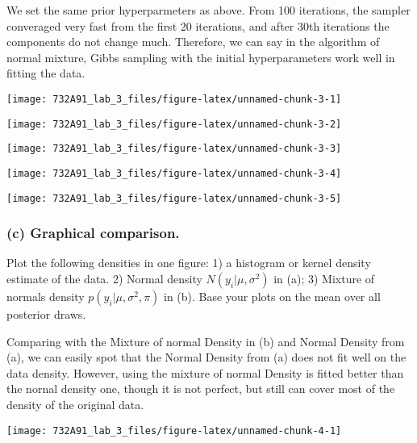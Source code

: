 \documentclass[]{article}
\begin{document}
We set the same prior hyperparmeters as above. From 100 iterations, the
sampler converaged very fast from the first 20 iterations, and after
30th iterations the components do not change much. Therefore, we can say
in the algorithm of normal mixture, Gibbs sampling with the initial
hyperparameters work well in fitting the data.

\begin{center}\texttt{[image: 732A91\_lab\_3\_files/figure-latex/unnamed-chunk-3-1]} \end{center}

\begin{center}\texttt{[image: 732A91\_lab\_3\_files/figure-latex/unnamed-chunk-3-2]} \end{center}

\begin{center}\texttt{[image: 732A91\_lab\_3\_files/figure-latex/unnamed-chunk-3-3]} \end{center}

\begin{center}\texttt{[image: 732A91\_lab\_3\_files/figure-latex/unnamed-chunk-3-4]} \end{center}

\begin{center}\texttt{[image: 732A91\_lab\_3\_files/figure-latex/unnamed-chunk-3-5]} \end{center}

\hypertarget{c-graphical-comparison.}{%
\subsubsection{(c) Graphical
comparison.}\label{c-graphical-comparison.}}

Plot the following densities in one figure: 1) a histogram or kernel
density estimate of the data. 2) Normal density
\(N(y_i |\mu, \sigma^2 )\) in (a); 3) Mixture of normals density
\(p(y_i |\mu, \sigma^2 , \pi)\) in (b). Base your plots on the mean over
all posterior draws.

Comparing with the Mixture of normal Density in (b) and Normal Density
from (a), we can easily spot that the Normal Density from (a) does not
fit well on the data density. However, using the mixture of normal
Density is fitted better than the nornal density one, though it is not
perfect, but still can cover most of the density of the original data.

\begin{center}\texttt{[image: 732A91\_lab\_3\_files/figure-latex/unnamed-chunk-4-1]} \end{center}
\end{document}
